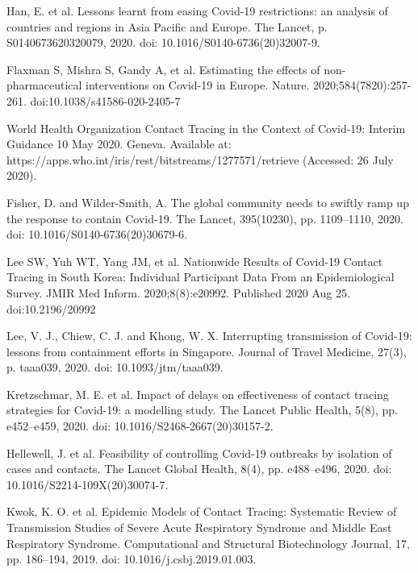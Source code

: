 \documentclass{article}
\begin{document}
\begin{thebibliography}{1}

  Han, E. et al.
  \newblock Lessons learnt from easing Covid-19 restrictions: an analysis of countries and regions in Asia Pacific and Europe.
  \newblock The Lancet, p. S0140673620320079, 2020.
  \newblock doi: 10.1016/S0140-6736(20)32007-9.

  Flaxman S, Mishra S, Gandy A, et al.
  \newblock Estimating the effects of non-pharmaceutical interventions on
  Covid-19 in Europe.
  \newblock Nature. 2020;584(7820):257-261.
  \newblock doi:10.1038/s41586-020-2405-7

  World Health Organization
  \newblock Contact Tracing in the Context of Covid-19: Interim Guidance 10 May 2020. Geneva.
  \newblock Available at: https://apps.who.int/iris/rest/bitstreams/1277571/retrieve (Accessed: 26 July 2020).

  Fisher, D. and Wilder-Smith, A.
  \newblock The global community needs to swiftly ramp up the response to contain Covid-19.
  \newblock The Lancet, 395(10230), pp. 1109–1110, 2020.
  \newblock doi: 10.1016/S0140-6736(20)30679-6.

  Lee SW, Yuh WT, Yang JM, et al.
  \newblock Nationwide Results of Covid-19 Contact Tracing in South Korea:
  Individual Participant Data From an Epidemiological Survey.
  \newblock JMIR Med Inform. 2020;8(8):e20992. Published 2020 Aug 25.
  \newblock doi:10.2196/20992

  Lee, V. J., Chiew, C. J. and Khong, W. X.
  \newblock Interrupting transmission of Covid-19: lessons from containment efforts in Singapore.
  \newblock Journal of Travel Medicine, 27(3), p. taaa039, 2020.
  \newblock doi: 10.1093/jtm/taaa039.

  Kretzschmar, M. E. et al.
  \newblock Impact of delays on effectiveness of contact tracing strategies for Covid-19: a modelling study.
  \newblock The Lancet Public Health, 5(8), pp. e452–e459, 2020.
  \newblock doi: 10.1016/S2468-2667(20)30157-2.

  Hellewell, J. et al.
  \newblock Feasibility of controlling Covid-19 outbreaks by isolation of cases and contacts.
  \newblock The Lancet Global Health, 8(4), pp. e488–e496, 2020.
  \newblock doi: 10.1016/S2214-109X(20)30074-7.

  Kwok, K. O. et al.
  \newblock Epidemic Models of Contact Tracing: Systematic Review of Transmission Studies of Severe Acute Respiratory Syndrome and Middle East Respiratory Syndrome.
  \newblock Computational and Structural Biotechnology Journal, 17, pp. 186–194, 2019.
  \newblock doi: 10.1016/j.csbj.2019.01.003.


\end{thebibliography}
\end{document}

